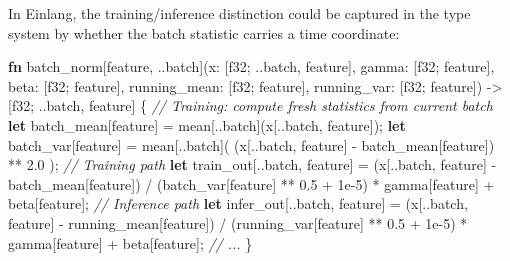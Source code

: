 \documentclass[11pt,titlepage]{article}
\newenvironment{Shaded}{}{}
\newcommand{\CommentTok}[1]{\textcolor[rgb]{0.38,0.63,0.69}{\textit{#1}}}
\newcommand{\DataTypeTok}[1]{\textcolor[rgb]{0.56,0.13,0.00}{#1}}
\newcommand{\DecValTok}[1]{\textcolor[rgb]{0.25,0.63,0.44}{#1}}
\newcommand{\KeywordTok}[1]{\textcolor[rgb]{0.00,0.44,0.13}{\textbf{#1}}}
\newcommand{\NormalTok}[1]{#1}
\newcommand{\OperatorTok}[1]{\textcolor[rgb]{0.40,0.40,0.40}{#1}}
\begin{document}
In Einlang, the training/inference distinction could be captured in the
type system by whether the batch statistic carries a time coordinate:

\begin{Shaded}
\begin{Highlighting}[]
\KeywordTok{fn}\NormalTok{ batch_norm[feature, ..batch](x: }\OperatorTok{[}\DataTypeTok{f32}\NormalTok{; ..batch, feature}\OperatorTok{]}\NormalTok{,}
\NormalTok{    gamma: }\OperatorTok{[}\DataTypeTok{f32}\NormalTok{; feature}\OperatorTok{]}\NormalTok{, beta: }\OperatorTok{[}\DataTypeTok{f32}\NormalTok{; feature}\OperatorTok{]}\NormalTok{,}
\NormalTok{    running_mean: }\OperatorTok{[}\DataTypeTok{f32}\NormalTok{; feature}\OperatorTok{]}\NormalTok{, running_var: }\OperatorTok{[}\DataTypeTok{f32}\NormalTok{; feature}\OperatorTok{]}\NormalTok{)}
\NormalTok{    -> }\OperatorTok{[}\DataTypeTok{f32}\NormalTok{; ..batch, feature}\OperatorTok{]}
\OperatorTok{\{}
    \CommentTok{// Training: compute fresh statistics from current batch}
    \KeywordTok{let}\NormalTok{ batch_mean}\OperatorTok{[}\NormalTok{feature}\OperatorTok{]}\NormalTok{ = mean}\OperatorTok{[}\NormalTok{..batch}\OperatorTok{]}\NormalTok{(x}\OperatorTok{[}\NormalTok{..batch, feature}\OperatorTok{]}\NormalTok{);}
    \KeywordTok{let}\NormalTok{ batch_var}\OperatorTok{[}\NormalTok{feature}\OperatorTok{]}\NormalTok{ = mean}\OperatorTok{[}\NormalTok{..batch}\OperatorTok{]}\NormalTok{(}
\NormalTok{        (x}\OperatorTok{[}\NormalTok{..batch, feature}\OperatorTok{]}\NormalTok{ - batch_mean}\OperatorTok{[}\NormalTok{feature}\OperatorTok{]}\NormalTok{) ** }\DecValTok{2.0}
\NormalTok{    );}
    \CommentTok{// Training path}
    \KeywordTok{let}\NormalTok{ train_out}\OperatorTok{[}\NormalTok{..batch, feature}\OperatorTok{]}\NormalTok{ =}
\NormalTok{        (x}\OperatorTok{[}\NormalTok{..batch, feature}\OperatorTok{]}\NormalTok{ - batch_mean}\OperatorTok{[}\NormalTok{feature}\OperatorTok{]}\NormalTok{)}
\NormalTok{        / (batch_var}\OperatorTok{[}\NormalTok{feature}\OperatorTok{]}\NormalTok{ ** }\DecValTok{0.5}\NormalTok{ + }\DecValTok{1}\NormalTok{e-}\DecValTok{5}\NormalTok{)}
\NormalTok{        * gamma}\OperatorTok{[}\NormalTok{feature}\OperatorTok{]}\NormalTok{ + beta}\OperatorTok{[}\NormalTok{feature}\OperatorTok{]}\NormalTok{;}
    \CommentTok{// Inference path}
    \KeywordTok{let}\NormalTok{ infer_out}\OperatorTok{[}\NormalTok{..batch, feature}\OperatorTok{]}\NormalTok{ =}
\NormalTok{        (x}\OperatorTok{[}\NormalTok{..batch, feature}\OperatorTok{]}\NormalTok{ - running_mean}\OperatorTok{[}\NormalTok{feature}\OperatorTok{]}\NormalTok{)}
\NormalTok{        / (running_var}\OperatorTok{[}\NormalTok{feature}\OperatorTok{]}\NormalTok{ ** }\DecValTok{0.5}\NormalTok{ + }\DecValTok{1}\NormalTok{e-}\DecValTok{5}\NormalTok{)}
\NormalTok{        * gamma}\OperatorTok{[}\NormalTok{feature}\OperatorTok{]}\NormalTok{ + beta}\OperatorTok{[}\NormalTok{feature}\OperatorTok{]}\NormalTok{;}
    \CommentTok{// ...}
\OperatorTok{\}}
\end{Highlighting}
\end{Shaded}
\end{document}
